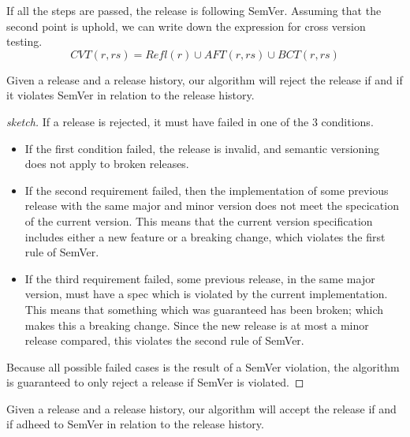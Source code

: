 If all the steps are passed, the release is following SemVer. Assuming that the 
second point is uphold, we can write down the expression for cross version testing. 
$$ CVT(r, rs) = Refl(r) \cup AFT(r, rs) \cup BCT(r, rs) $$

\begin{theorem}[Soundness]
Given a release and a release history, our algorithm will reject the release if
and if it violates SemVer in relation to the release history.
\end{theorem}

\begin{proof}[sketch]
If a release is rejected, it must have failed in one of the 3 conditions. 
\begin{itemize}
\item If the first condition failed, the release is invalid, and semantic
  versioning does not apply to broken releases. 
\item If the second requirement failed, then the implementation of
  some previous release with the same major and minor version does
  not meet the specication of the current version. This means that
  the current version specification includes either a new feature
  or a breaking change, which violates the first rule of SemVer.
\item If the third requirement failed, some previous release, in the same
  major version,  must have a spec which is violated by the current
  implementation. This means that something which was guaranteed has been
  broken; which makes this a breaking change. Since the new release is at
  most a minor release compared, this violates the second rule of SemVer.
\end{itemize}
Because all possible failed cases is the result of a SemVer violation, the
algorithm is guaranteed to only reject a release if SemVer is violated.
\end{proof}

\begin{theorem}[Completness]
Given a release and a release history, our algorithm will accept the release if
and if adheed to SemVer in relation to the release history.
\end{theorem}


